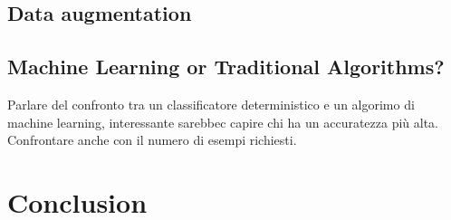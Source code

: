 \documentclass[10pt,twocolumn,letterpaper]{article}
\begin{document}
\subsection{Data augmentation}

\subsection{Machine Learning or Traditional Algorithms?}
Parlare del confronto tra un classificatore deterministico e un algorimo di machine learning, interessante sarebbec capire chi ha un accuratezza più alta. Confrontare anche con il numero di esempi richiesti.

\section{Conclusion}


{\small


}
\end{document}
